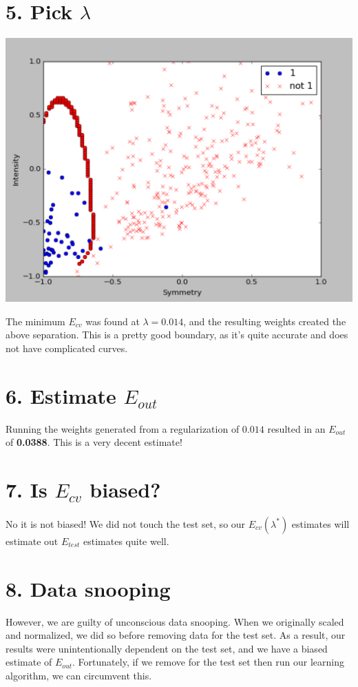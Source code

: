 \documentclass[12pt]{article}
\begin{document}
\section*{5. Pick $\lambda$}
\includegraphics[scale=.5]{5-1.png}

The minimum $E_{cv}$ was found at $\lambda = 0.014$, and the resulting weights created the above separation. This is a pretty good boundary, as it's quite accurate and does not have complicated curves.

\section*{6. Estimate $E_{out}$}
Running the weights generated from a regularization of $0.014$ resulted in an $E_{out}$ of \textbf{0.0388}. This is a very decent estimate!

\section*{7. Is $E_{cv}$ biased?}
No it is not biased! We did not touch the test set, so our $E_{cv}(\lambda^*)$ estimates will estimate out $E_{test}$ estimates quite well.

\section*{8. Data snooping}
However, we are guilty of unconscious data snooping. When we originally scaled and normalized, we did so before removing data for the test set. As a result, our results were unintentionally dependent on the test set, and we have a biased estimate of $E_{out}$. Fortunately, if we remove for the test set then run our learning algorithm, we can circumvent this.
\end{document}
